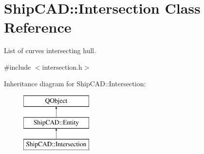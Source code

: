 \hypertarget{classShipCAD_1_1Intersection}{\section{Ship\-C\-A\-D\-:\-:Intersection Class Reference}
\label{classShipCAD_1_1Intersection}
}


List of curves intersecting hull.  




{\ttfamily \#include $<$intersection.\-h$>$}

Inheritance diagram for Ship\-C\-A\-D\-:\-:Intersection\-:\begin{figure}[H]
\begin{center}
\leavevmode
\includegraphics[height=3.000000cm]{classShipCAD_1_1Intersection}
\end{center}
\end{figure}
